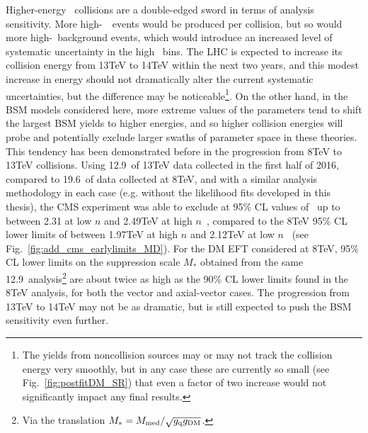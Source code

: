 Higher-energy \Pp\Pp\ collisions are a double-edged sword in terms of analysis sensitivity. More high-\ETgamma\ \zinvg\ events would
be produced per collision, but so would more high-\ETgamma\ background events, which would introduce an increased level of systematic uncertainty
in the high \ETgamma\ bins. The LHC is expected to increase its collision energy from 13\unit{TeV} to 14\unit{TeV} within the next two years,
and this modest increase in energy should not dramatically alter the current systematic uncertainties, but the difference may be
noticeable\footnote{The yields from noncollision sources may or may not track the collision energy very smoothly, but in any case these are currently so small
(see Fig.~\ref{fig:postfitDM_SR}) that even a factor of two increase would not significantly impact any final results.}. On the other hand,
in the BSM models considered here, more extreme values of the parameters tend to shift the largest BSM yields to higher energies,
and so higher collision energies will probe and potentially exclude larger swaths of parameter space in these theories. This tendency has been
demonstrated before in the progression from 8\unit{TeV} to 13\unit{TeV} collisions. Using 12.9\fbinv\ of 13\unit{TeV} data collected in the
first half of 2016, compared to 19.6\fbinv\ of data collected at 8\unit{TeV}, and with a similar analysis methodology in each case (e.g. without
the likelihood fits developed in this thesis), the CMS experiment was able to exclude at 95\% CL values of \mD\ up to between 2.31 at low $n$ and 2.49\unit{TeV}
at high $n$~\cite{ref:JHEP10(2017)073}, compared to the 8\unit{TeV} 95\% CL lower limits of between 1.97\unit{TeV} at high $n$ and 2.12\unit{TeV} at low $n$~\cite{ref:j.physletb.2016.01.057}
(see Fig.~\ref{fig:add_cms_earlylimits_MD}).
For the DM EFT considered at 8\unit{TeV}, 95\% CL lower limits on the suppression scale $M_\mathrm{*}$ obtained from the same 12.9\fbinv\ analysis\footnote{Via
the translation $M_\mathrm{*} = M_\mathrm{med}/\sqrt{g_\mathrm{q}g_\mathrm{DM}}$.} are about twice as high as the 90\% CL lower limits found in the 8\unit{TeV} analysis, for both the vector and
axial-vector cases. The progression from 13\unit{TeV} to 14\unit{TeV} may not be as dramatic, but is still expected to push the BSM sensitivity even further.
